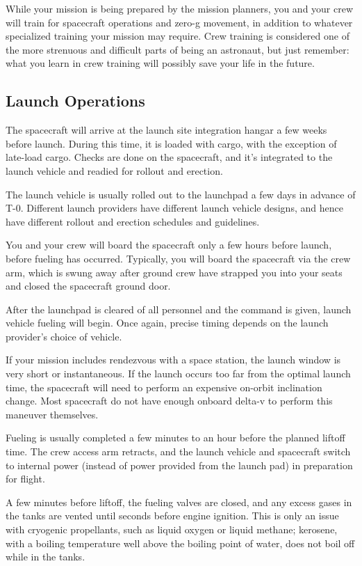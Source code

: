 While your mission is being prepared by the mission planners, you and
your crew will train for spacecraft operations and zero-g movement, in
addition to whatever specialized training your mission may
require. Crew training is considered one of the more strenuous and
difficult parts of being an astronaut, but just remember: what you
learn in crew training will possibly save your life in the future.

\subsection{Launch Operations}

The spacecraft will arrive at the launch site integration hangar a few
weeks before launch. During this time, it is loaded with cargo, with
the exception of late-load cargo. Checks are done on the spacecraft,
and it's integrated to the launch vehicle and readied for rollout and
erection.

The launch vehicle is usually rolled out to the launchpad a few days
in advance of T-0. Different launch providers have different launch
vehicle designs, and hence have different rollout and erection
schedules and guidelines.

You and your crew will board the spacecraft only a few hours before
launch, before fueling has occurred. Typically, you will board the
spacecraft via the crew arm, which is swung away after ground crew
have strapped you into your seats and closed the spacecraft ground
door.

After the launchpad is cleared of all personnel and the command is
given, launch vehicle fueling will begin. Once again, precise timing
depends on the launch provider's choice of vehicle.

If your mission includes rendezvous with a space station, the launch
window is very short or instantaneous. If the launch occurs too far
from the optimal launch time, the spacecraft will need to perform an
expensive on-orbit inclination change. Most spacecraft do not have
enough onboard delta-v to perform this maneuver themselves.

Fueling is usually completed a few minutes to an hour before the
planned liftoff time. The crew access arm retracts, and the launch
vehicle and spacecraft switch to internal power (instead of power
provided from the launch pad) in preparation for flight.

A few minutes before liftoff, the fueling valves are closed, and any
excess gases in the tanks are vented until seconds before engine
ignition. This is only an issue with cryogenic propellants, such as
liquid oxygen or liquid methane; kerosene, with a boiling temperature
well above the boiling point of water, does not boil off while in the
tanks.

